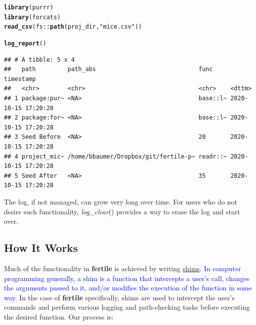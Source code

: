 \documentclass[APA,LATO1COL]{WileyNJD-v2}\usepackage[]{graphicx}\usepackage[]{color}
\makeatletter
\newcommand{\hlstr}[1]{\textcolor[rgb]{0.192,0.494,0.8}{#1}}%
\newcommand{\hlopt}[1]{\textcolor[rgb]{0,0,0}{#1}}%
\newcommand{\hlstd}[1]{\textcolor[rgb]{0.345,0.345,0.345}{#1}}%
\newcommand{\hlkwd}[1]{\textcolor[rgb]{0.737,0.353,0.396}{\textbf{#1}}}%
\newenvironment{kframe}{%
 \def\at@end@of@kframe{}%
 \ifinner\ifhmode%
  \def\at@end@of@kframe{\end{minipage}}%
  \begin{minipage}{\columnwidth}%
 \fi\fi%
 \def\FrameCommand##1{\hskip\@totalleftmargin \hskip-\fboxsep
 \colorbox{shadecolor}{##1}\hskip-\fboxsep
     \hskip-\linewidth \hskip-\@totalleftmargin \hskip\columnwidth}%
 \MakeFramed {\advance\hsize-\width
   \@totalleftmargin\z@ \linewidth\hsize
   \@setminipage}}%
 {\par\unskip\endMakeFramed%
 \at@end@of@kframe}
\newenvironment{knitrout}{}{} %
\newcommand{\pkg}[1]{\textbf{#1}}
\newcommand{\func}[1]{\textit{#1}()}
\makeatother
\begin{document}
\begin{knitrout}
\color{fgcolor}\begin{kframe}
\begin{alltt}
\hlkwd{library}\hlstd{(purrr)}
\hlkwd{library}\hlstd{(forcats)}
\hlkwd{read_csv}\hlstd{(fs}\hlopt{::}\hlkwd{path}\hlstd{(proj_dir,} \hlstr{"mice.csv"}\hlstd{))}
\end{alltt}
\end{kframe}
\end{knitrout}

\begin{knitrout}
\color{fgcolor}\begin{kframe}
\begin{alltt}
\hlkwd{log_report}\hlstd{()}
\end{alltt}
\begin{verbatim}
## # A tibble: 5 x 4
##   path         path_abs                             func     timestamp          
##   <chr>        <chr>                                <chr>    <dttm>             
## 1 package:pur~ <NA>                                 base::l~ 2020-10-15 17:20:28
## 2 package:for~ <NA>                                 base::l~ 2020-10-15 17:20:28
## 3 Seed Before  <NA>                                 20       2020-10-15 17:20:28
## 4 project_mic~ /home/bbaumer/Dropbox/git/fertile-p~ readr::~ 2020-10-15 17:20:28
## 5 Seed After   <NA>                                 35       2020-10-15 17:20:28
\end{verbatim}
\end{kframe}
\end{knitrout}

The log, if not managed, can grow very long over time. For users who do not desire such functionality, \func{log\_clear} provides a way to erase the log and start over.




\subsection{How It Works}

Much of the functionality in \pkg{fertile} is achieved by writing \href{https://en.wikipedia.org/wiki/Shim_(computing)}{shims}. \textcolor{blue}{{In computer programming generally, a shim is a function that intercepts a user's call, changes the arguments passed to it, and/or modifies the execution of the function in some way.}} In the case of \pkg{fertile} specifically, shims are used to intercept the user's commands and perform various logging and path-checking tasks before executing the desired function. Our process is:
\end{document}
